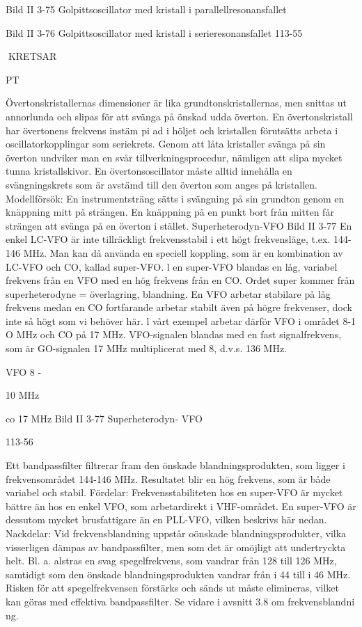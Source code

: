 Bild II 3-75 Golpittsoscillator med kristall
i parallellresonansfallet

Bild II 3-76 Golpittsoscillator med kristall
i serieresonansfallet
113-55

KRETSAR

PT

Övertonskristallernas dimensioner är lika
grundtonskristallernas, men snittas ut annorlunda och slipas för att svänga på önskad
udda överton. En övertonskristall har övertonens frekvens instäm pi ad i höljet och kristallen förutsätts arbeta i oscillatorkopplingar
som seriekrets. Genom att låta kristaller
svänga på sin överton undviker man en svår
tillverkningsprocedur, nämligen att slipa
mycket tunna kristallskivor.
En övertonsoscillator måste alltid innehålla en svängningskrets som är avstämd till
den överton som anges på kristallen.
Modellförsök: En instrumentsträng sätts i
svängning på sin grundton genom en knäppning mitt på strängen. En knäppning på en
punkt bort från mitten får strängen att svänga
på en överton i stället.
Superheterodyn-VFO
Bild II 3-77
En enkel LC-VFO är inte tillräckligt frekvensstabil i ett högt frekvensläge, t.ex. 144-146
MHz. Man kan då använda en speciell koppling, som är en kombination av LC-VFO och
CO, kallad super-VFO.
l en super-VFO blandas en låg, variabel
frekvens från en VFO med en hög frekvens
från en CO. Ordet super kommer från
superheterodyne = överlagring, blandning.
En VFO arbetar stabilare på låg frekvens
medan en CO fortfarande arbetar stabilt
även på högre frekvenser, dock inte så högt
som vi behöver här. l vårt exempel arbetar
därför VFO i området 8-1 O MHz och CO på
17 MHz. VFO-signalen blandas med en fast
signalfrekvens, som är GO-signalen 17 MHz
multiplicerat med 8, d.v.s. 136 MHz.

VFO 8 -

10 MHz

co 17 MHz
Bild II 3-77 Superheterodyn- VFO

113-56

Ett bandpassfilter filtrerar fram den önskade blandningsprodukten, som ligger i
frekvensområdet 144-146 MHz. Resultatet
blir en hög frekvens, som är både variabel
och stabil.
Fördelar:
Frekvensstabiliteten hos en super-VFO
är mycket bättre än hos en enkel VFO, som
arbetardirekt i VHF-området. En super-VFO
är dessutom mycket brusfattigare än en
PLL-VFO, vilken beskrivs här nedan.
Nackdelar:
Vid frekvensblandning uppstår oönskade blandningsprodukter, vilka visserligen
dämpas av bandpassfilter, men som det är
omöjligt att undertryckta helt. Bl. a. alstras en
svag spegelfrekvens, som vandrar från 128
till 126 MHz, samtidigt som den önskade
blandningsprodukten vandrar från i 44 till
i 46 MHz. Risken för att spegelfrekvensen
förstärks och sänds ut måste elimineras,
vilket kan göras med effektiva bandpassfilter. Se vidare i avsnitt 3.8 om frekvensblandni ng.

